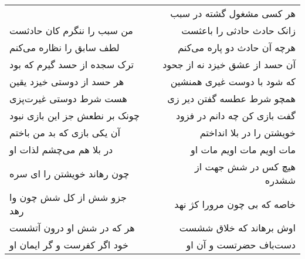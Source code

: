 \begin{center}
\begin{longtable}{l p{0.5cm} r}
&&
هر کسی مشغول گشته در سبب
\\
من سبب را ننگرم کان حادثست
&&
زانک حادث حادثی را باعثست
\\
لطف سابق را نظاره می‌کنم
&&
هرچه آن حادث دو پاره می‌کنم
\\
ترک سجده از حسد گیرم که بود
&&
آن حسد از عشق خیزد نه از جحود
\\
هر حسد از دوستی خیزد یقین
&&
که شود با دوست غیری همنشین
\\
هست شرط دوستی غیرت‌پزی
&&
همچو شرط عطسه گفتن دیر زی
\\
چونک بر نطعش جز این بازی نبود
&&
گفت بازی کن چه دانم در فزود
\\
آن یکی بازی که بد من باختم
&&
خویشتن را در بلا انداختم
\\
در بلا هم می‌چشم لذات او
&&
مات اویم مات اویم مات او
\\
چون رهاند خویشتن را ای سره
&&
هیچ کس در شش جهت از ششدره
\\
جزو شش از کل شش چون وا رهد
&&
خاصه که بی چون مرورا کژ نهد
\\
هر که در شش او درون آتشست
&&
اوش برهاند که خلاق ششست
\\
خود اگر کفرست و گر ایمان او
&&
دست‌باف حضرتست و آن او
\\
\end{longtable}
\end{center}
